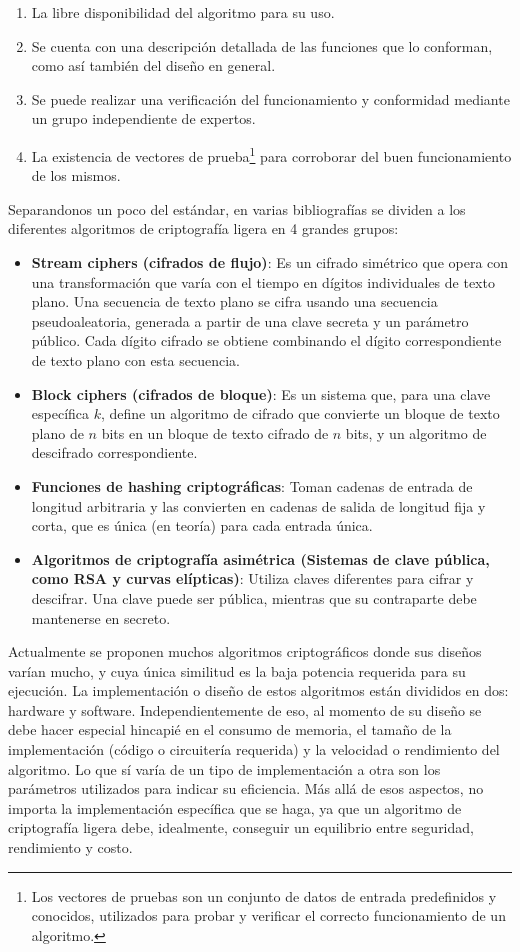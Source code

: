 \documentclass[]{article}
\begin{document}
\begin{enumerate}
	\item La libre disponibilidad del algoritmo para su uso.
	\item Se cuenta con una descripción detallada de las funciones que lo conforman, como así también del diseño en general.
	\item Se puede realizar una verificación del funcionamiento y conformidad mediante un grupo independiente de expertos.
	\item La existencia de vectores de prueba\footnote{Los vectores de pruebas son un conjunto de datos de entrada predefinidos y conocidos, utilizados para probar y verificar el correcto funcionamiento de un algoritmo.} para corroborar del buen funcionamiento de los mismos.
\end{enumerate}
Separandonos un poco del estándar, en varias bibliografías se dividen a los diferentes algoritmos de criptografía ligera en 4 grandes grupos:
\begin{itemize}
	\item \textbf{Stream ciphers (cifrados de flujo)}: Es un cifrado simétrico que opera con una transformación que varía con el tiempo en dígitos individuales de texto plano. Una secuencia de texto plano se cifra usando una secuencia pseudoaleatoria, generada a partir de una clave secreta y un parámetro público. Cada dígito cifrado se obtiene combinando el dígito correspondiente de texto plano con esta secuencia.
	\item \textbf{Block ciphers (cifrados de bloque)}: Es un sistema que, para una clave específica $k$, define un algoritmo de cifrado que convierte un bloque de texto plano de $n$ bits en un bloque de texto cifrado de $n$ bits, y un algoritmo de descifrado correspondiente.
	\item \textbf{Funciones de hashing criptográficas}: Toman cadenas de entrada de longitud arbitraria y las convierten en cadenas de salida de longitud fija y corta, que es única (en teoría) para cada entrada única.
	\item \textbf{Algoritmos de criptografía asimétrica (Sistemas de clave pública, como RSA y curvas elípticas)}: Utiliza claves diferentes para cifrar y descifrar. Una clave puede ser pública, mientras que su contraparte debe mantenerse en secreto.
\end{itemize}
Actualmente se proponen muchos algoritmos criptográficos donde sus diseños varían mucho, y cuya única similitud es la baja potencia requerida para su ejecución. La implementación o diseño de estos algoritmos están divididos en dos: hardware y software. Independientemente de eso, al momento de su diseño se debe hacer especial hincapié en el consumo de memoria, el tamaño de la implementación (código o circuitería requerida) y la velocidad o rendimiento del algoritmo. Lo que sí varía de un tipo de implementación a otra son los parámetros utilizados para indicar su eficiencia. Más allá de esos aspectos, no importa la implementación específica que se haga, ya que un algoritmo de criptografía ligera debe, idealmente, conseguir un equilibrio entre seguridad, rendimiento y costo.
\end{document}
